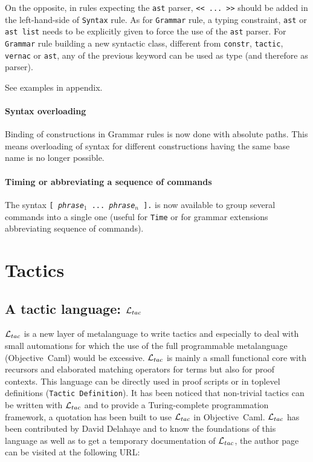 \documentclass[11pt]{article}
\begin{document}
On the opposite, in rules expecting the {\tt ast} parser,
{\verb:<< ... >>:} should be added in the left-hand-side of {\tt Syntax} rule.
As for {\tt Grammar} rule, a typing constraint, {\tt ast} or {\tt ast
list} needs to be explicitly given to force the use of the {\tt ast}
parser. For {\tt Grammar} rule building a new syntactic class,
different from {\tt constr}, {\tt tactic}, {\tt vernac} or {\tt ast},
any of the previous keyword can be used as type (and therefore as
parser).

See examples in appendix.

\paragraph{Syntax overloading}

 Binding of constructions in Grammar rules is now done with absolute
  paths. This means overloading of syntax for different constructions
  having the same base name is no longer possible.

\paragraph{Timing or abbreviating a sequence of commands}

The syntax {\tt [ {\it phrase$_1$} ... {\it phrase$_n$} ].} is now
available to group several commands into a single one (useful for
{\tt Time} or for grammar extensions abbreviating sequence of commands).

\section{Tactics}
\label{Tactics}
\def\oc{{\sf Objective~Caml}}

\subsection{A tactic language: ${\cal L}_{tac}$}

${\cal L}_{tac}$ is a new layer of metalanguage to write tactics and especially to deal
with small automations for which the use of the full programmable metalanguage
(\oc{}) would be excessive. ${\cal L}_{tac}$ is mainly a	small functional core with
recursors and elaborated matching operators for terms but also for proof
contexts. This language can be directly used in proof scripts or in toplevel
definitions ({\tt Tactic~Definition}). It has been noticed that non-trivial
tactics can be written with ${\cal L}_{tac}$ and to provide a Turing-complete
programmation framework, a quotation has been built to use ${\cal L}_{tac}$ in \oc{}.
${\cal L}_{tac}$ has been contributed by David Delahaye and to know the foundations of
this language as well as to get a temporary documentation of ${\cal L}_{tac}$, the
author page can be visited at the following URL:\\
\end{document}
